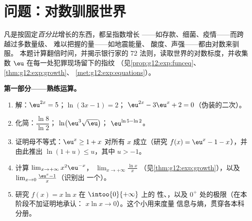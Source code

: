 \section{问题：对数驯服世界}

\begin{problem}
\label{pb:g12:exp:1}
凡是按固定\emph{百分比}增长的东西，都呈指数增长
——如存款、细菌、疫情——而跨越过多数量级、
难以把握的量——如地震能量、
酸度、声强——都由对数来驯服。
本题计算翻倍时间，并揭示银行家的
72 法则，读取世界的对数标度，并收集
数 $\eu$ 在每一处犯罪现场留下的指纹
（见\cref{prop:g12:exp:funceq}、\cref{thm:g12:exp:growth}、
\cref{met:g12:exp:equations}）。

\medskip
\noindent\textbf{第一部分——熟练运算。}
\begin{enumerate}
  \item 解：$\eu^{2x} = 5$；\quad $\ln(3x - 1) = 2$；\quad
        $\eu^{2x} - 3\eu^x + 2 = 0$（伪装的二次）。
  \item 化简：$\dfrac{\ln 8}{\ln 2}$；\quad
        $\ln\!\left(\eu^3 \sqrt{\eu}\right)$；\quad
        $\eu^{\ln 5 - \ln 2}$。
  \item 证明母不等式：$\eu^x \geq 1 + x$ 对所有
         $x$ 成立（研究 $f(x) = \eu^x - 1 - x$），并由此推出
        $\ln(1 + u) \leq u$，其中 $u > -1$。
  \item 计算
        $\lim_{x \to +\infty} x^2 \eu^{-x}$，
        $\lim_{x \to +\infty} \frac{\ln x}{x}$
        （见\cref{thm:g12:exp:growth}），以及
        $\lim_{x \to 0} \frac{\eu^x - 1}{x}$（识别出
        一个）。
  \item 研究 $f(x) = x \ln x$ 在 $\intoo{0}{+\infty}$ 上的
        性、，以及 $0^+$ 处的极限（在本阶段不加证明地承认：
        $x \ln x \to 0$）。这个小用来度量
        信息与熵，贯穿各本科分册。
\end{enumerate}


\end{problem}
